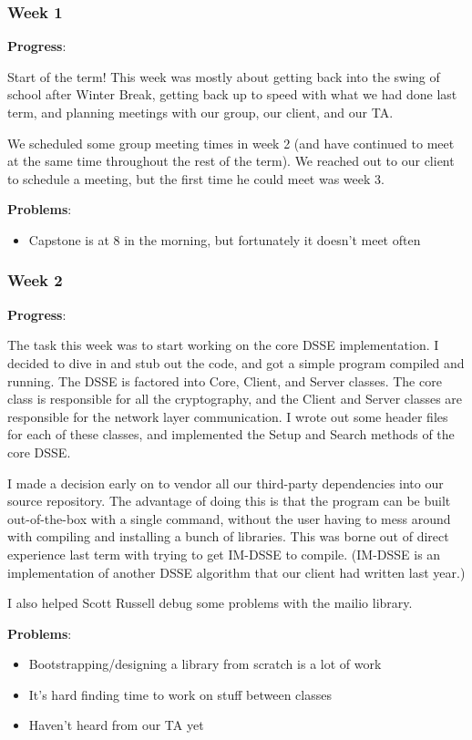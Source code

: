 \subsubsection{Week 1} 

\noindent \textbf{Progress}:

Start of the term!
This week was mostly about getting back into the swing of school after Winter Break, getting back up to speed with what we had done last term, and planning meetings with our group, our client, and our TA.

We scheduled some group meeting times in week 2 (and have continued to meet at the same time throughout the rest of the term). We reached out to our client to schedule a meeting, but the first time he could meet was week 3.

\noindent \textbf{Problems}:
\begin{itemize}
\item Capstone is at 8 in the morning, but fortunately it doesn't meet often
\end{itemize}

\subsubsection{Week 2}

\noindent \textbf{Progress}:

The task this week was to start working on the core DSSE implementation. I decided to dive in and stub out the code, and got a simple program compiled and running. The DSSE is factored into Core, Client, and Server classes. The core class is responsible for all the cryptography, and the Client and Server classes are responsible for the network layer communication. I wrote out some header files for each of these classes, and implemented the Setup and Search methods of the core DSSE.

I made a decision early on to vendor all our third-party dependencies into our source repository. The advantage of doing this is that the program can be built out-of-the-box with a single command, without the user having to mess around with compiling and installing a bunch of libraries. This was borne out of direct experience last term with trying to get IM-DSSE to compile. (IM-DSSE is an implementation of another DSSE algorithm that our client had written last year.)

I also helped Scott Russell debug some problems with the mailio library.

\noindent \textbf{Problems}:
\begin{itemize}
  \item Bootstrapping/designing a library from scratch is a lot of work 
  \item It's hard finding time to work on stuff between classes 
  \item Haven't heard from our TA yet
\end{itemize}

